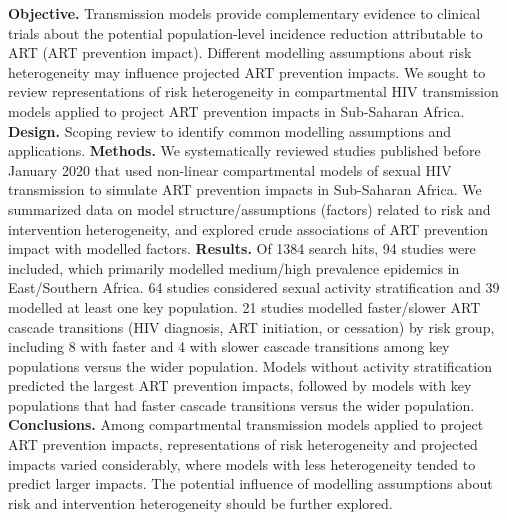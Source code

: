\textbf{Objective.}
Transmission models provide complementary evidence to clinical trials about
the potential population-level incidence reduction attributable to ART (ART prevention impact).
Different modelling assumptions about risk heterogeneity may influence projected ART prevention impacts.
We sought to review representations of risk heterogeneity in compartmental HIV transmission models
applied to project ART prevention impacts in Sub-Saharan Africa.
\textbf{Design.}
Scoping review to identify common modelling assumptions and applications.
\textbf{Methods.}
We systematically reviewed studies published before January 2020 that used
non-linear compartmental models of sexual HIV transmission
to simulate ART prevention impacts in Sub-Saharan Africa.
We summarized data on model structure/assumptions (factors) related to risk and intervention heterogeneity,
and explored crude associations of ART prevention impact with modelled factors.
\textbf{Results.}
Of 1384 search hits, 94 studies were included,
which primarily modelled medium/high prevalence epidemics in East/Southern Africa.
64 studies considered sexual activity stratification and 39 modelled at least one key population.
21 studies modelled faster/slower ART cascade transitions (HIV diagnosis, ART initiation, or cessation) by risk group,
including 8 with faster and 4 with slower cascade transitions among key populations versus the wider population.
Models without activity stratification predicted the largest ART prevention impacts,
followed by models with key populations that had faster cascade transitions versus the wider population.
\textbf{Conclusions.}
Among compartmental transmission models applied to project ART prevention impacts,
representations of risk heterogeneity and projected impacts varied considerably,
where models with less heterogeneity tended to predict larger impacts.
The potential influence of modelling assumptions about
risk and intervention heterogeneity should be further explored.
